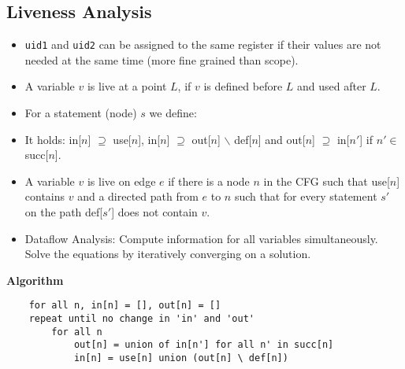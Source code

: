 \subsection*{Liveness Analysis}
\begin{itemize} 
	\item \texttt{uid1} and \texttt{uid2} can be assigned to the same register if their values are not needed at the same time (more fine grained than scope).
	
	\item A variable $v$ is live at a point $L$, if $v$ is defined before $L$ and used after $L$.
		
	\item For a statement (node) $s$ we define: 
	
	\item It holds: in[$n$] $\supseteq$ use[$n$], in[$n$] $\supseteq$ out[$n$] $\backslash$ def[$n$] and out[$n$] $\supseteq$ in[$n'$] if $n' \in $ succ[$n$].
		
	\item A variable $v$ is live on edge $e$ if there is a node $n$ in the CFG such that use[$n$] contains $v$ and a directed path from $e$ to $n$ such that for every statement $s'$ on the path def[$s'$] does not contain $v$.
		
	\item Dataflow Analysis: Compute information for all variables simultaneously. Solve the equations by iteratively converging on a solution.
\end{itemize}

\textbf{Algorithm}
\begin{lstlisting}
	for all n, in[n] = [], out[n] = []
	repeat until no change in 'in' and 'out'
		for all n
			out[n] = union of in[n'] for all n' in succ[n]
			in[n] = use[n] union (out[n] \ def[n])
\end{lstlisting}


